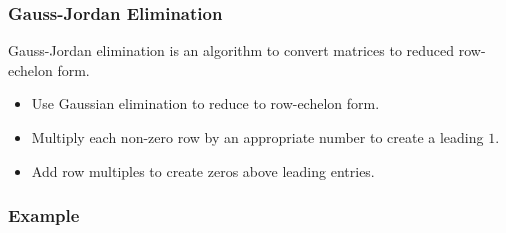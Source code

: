 \documentclass[12pt]{report}
\begin{document}
\begin{flushleft}
\subsubsection*{Gauss-Jordan Elimination}

Gauss-Jordan elimination is an algorithm to convert matrices to reduced
row-echelon form. 
\begin{itemize}
    \item Use Gaussian elimination to reduce to row-echelon form.
    \item Multiply each non-zero row by an appropriate number to create a
        leading \(1\).
    \item Add row multiples to create zeros above leading entries.
\end{itemize}

\subsubsection*{Example}


\end{flushleft}
\end{document}
